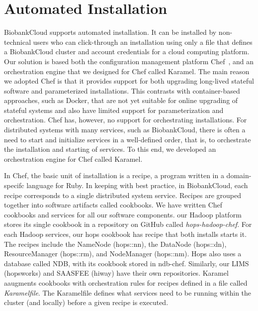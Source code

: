 \section{Automated Installation}

BiobankCloud supports automated installation. It can be installed by non-technical users who can click-through an installation using only a file that defines a BiobankCloud cluster and account credentials for a cloud computing platform. Our solution is based both the configuration management platform Chef~\cite{chef13nelson}, and an orchestration engine that we designed for Chef called Karamel. The main reason we adopted Chef is that it provides support for both upgrading long-lived stateful software and parameterized installations. This contrasts with container-based approaches, such as Docker, that are not yet suitable for online upgrading of stateful systems and also have limited support for parameterization and orchestration. Chef has, however, no support for orchestrating installations. For distributed systems with many services, such as BiobankCloud, there is often a need to start and initialize services in a well-defined order, that is, to orchestrate the installation and starting of services. To this end, we developed an orchestration engine for Chef called Karamel. 

In Chef, the basic unit of installation is a recipe, a program written in a domain-specifc language for Ruby. In keeping with best practice, in BiobankCloud, each recipe corresponds to a single distributed system service. Recipes are grouped together into software artifacts called cookbooks. We have written Chef cookbooks and services for all our software components. our Hadoop platform stores its single cookbook in a repository on GitHub called \textit{hops-hadoop-chef}. For each Hadoop services, our hops cookbook has recipe that both installs starts it. The recipes include the NameNode (hops::nn), the DataNode (hops::dn), ResourceManager (hops::rm), and NodeManager (hops::nm). Hops also uses a database called NDB, with its cookbook stored in ndb-chef. Similarly, our LIMS (hopsworks) and SAASFEE (hiway) have their own repositories. Karamel aaugments cookbooks with orchestration rules for recipes defined in a file called \textit{Karamelfile}. The Karamelfile defines what services need to be running within the cluster (and locally) before a given recipe is executed. 

